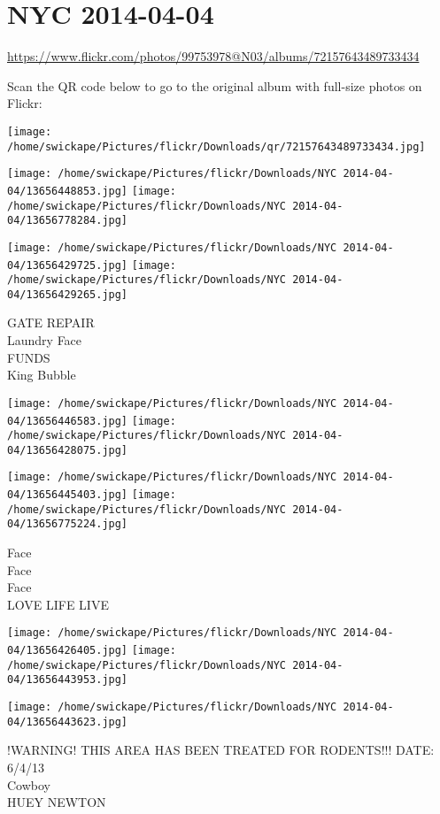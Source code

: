 \documentclass[10pt,letterpaper]{article}
\title{}
\author{}
\date{}
\begin{document}
\section*{NYC 2014-04-04}

\url{https://www.flickr.com/photos/99753978@N03/albums/72157643489733434}

Scan the QR code below to go to the original album with full-size photos on Flickr:

\texttt{[image: /home/swickape/Pictures/flickr/Downloads/qr/72157643489733434.jpg]}
\pagebreak

\texttt{[image: /home/swickape/Pictures/flickr/Downloads/NYC 2014-04-04/13656448853.jpg]}
\texttt{[image: /home/swickape/Pictures/flickr/Downloads/NYC 2014-04-04/13656778284.jpg]}

\texttt{[image: /home/swickape/Pictures/flickr/Downloads/NYC 2014-04-04/13656429725.jpg]}
\texttt{[image: /home/swickape/Pictures/flickr/Downloads/NYC 2014-04-04/13656429265.jpg]}

GATE REPAIR\\
Laundry Face\\
FUNDS\\
King Bubble
\pagebreak

\texttt{[image: /home/swickape/Pictures/flickr/Downloads/NYC 2014-04-04/13656446583.jpg]}
\texttt{[image: /home/swickape/Pictures/flickr/Downloads/NYC 2014-04-04/13656428075.jpg]}

\texttt{[image: /home/swickape/Pictures/flickr/Downloads/NYC 2014-04-04/13656445403.jpg]}
\texttt{[image: /home/swickape/Pictures/flickr/Downloads/NYC 2014-04-04/13656775224.jpg]}

Face\\
Face\\
Face\\
LOVE LIFE LIVE
\pagebreak

\texttt{[image: /home/swickape/Pictures/flickr/Downloads/NYC 2014-04-04/13656426405.jpg]}
\texttt{[image: /home/swickape/Pictures/flickr/Downloads/NYC 2014-04-04/13656443953.jpg]}

\vspace{0.25in}
\texttt{[image: /home/swickape/Pictures/flickr/Downloads/NYC 2014-04-04/13656443623.jpg]}

!WARNING! THIS AREA HAS BEEN TREATED FOR RODENTS!!! DATE: 6/4/13\\
Cowboy\\
HUEY NEWTON
\pagebreak
\end{document}
